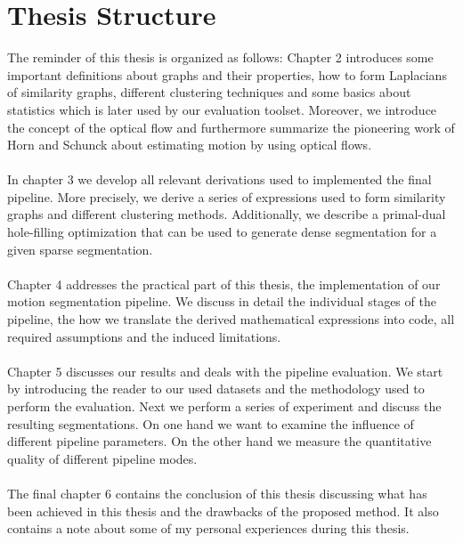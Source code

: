 \section{Thesis Structure}
The reminder of this thesis is organized as follows: Chapter 2 introduces some important definitions about graphs and their properties, how to form Laplacians of similarity graphs, different clustering techniques and some basics about statistics which is later used by our evaluation toolset. Moreover, we introduce the concept of the optical flow and furthermore summarize the pioneering work of Horn and Schunck about estimating motion by using optical flows. \\ \\
In chapter 3 we develop all relevant derivations used to implemented the final pipeline. More precisely, we derive a series of expressions used to form similarity graphs and different clustering methods. Additionally, we describe a primal-dual hole-filling optimization that can be used to generate dense segmentation for a given sparse segmentation. \\ \\
Chapter 4 addresses the practical part of this thesis, the implementation of our motion segmentation pipeline. We discuss in detail the individual stages of the pipeline, the how we translate the derived mathematical expressions into code, all required assumptions and the induced limitations. \\ \\
Chapter 5 discusses our results and deals with the pipeline evaluation. We start by introducing the reader to our used datasets and the methodology used to perform the evaluation. Next we perform a series of experiment and discuss the resulting segmentations. On one hand we want to examine the influence of different pipeline parameters. On the other hand we measure the quantitative quality of different pipeline modes. \\ \\
The final chapter 6 contains the conclusion of this thesis discussing what has been achieved in this thesis and the drawbacks of the proposed method. It also contains a note about some of my personal experiences during this thesis. 